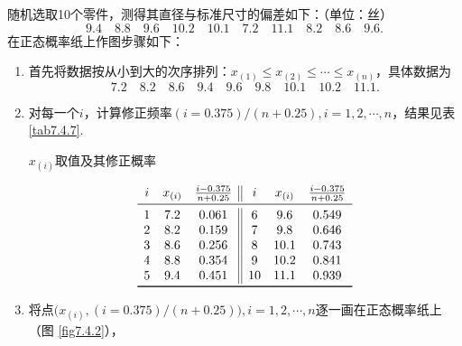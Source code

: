 \begin{example}\label{exam7.4.4}
  随机选取10个零件，测得其直径与标准尺寸的偏差如下：（单位：丝）
  \[
    9.4\quad 8.8 \quad 9.6 \quad 10.2 \quad 10.1 \quad 7.2 \quad 11.1 \quad 8.2 \quad 8.6 \quad 9.6.
  \]
  在正态概率纸上作图步骤如下：
  \begin{enumerate}
    \item 首先将数据按从小到大的次序排列：$x_{(1)}\le x_{(2)}\le\cdots\le x_{(n)}$，具体数据为
        \[
          7.2\quad 8.2 \quad 8.6 \quad 9.4 \quad 9.6 \quad 9.8 \quad 10.1 \quad 10.2 \quad 11.1.
        \]
    \item 对每一个$i$，计算修正频率$(i=0.375)/(n+0.25),i=1,2,\cdots,n$，结果见表 \ref{tab7.4.7}.
    \begin{table}[!ht]
    \centering
    \caption{$x_{(i)}$取值及其修正概率}\label{tab7.4.7}
    \[
      \begin{array}{ccc||ccc}
        i & x_{(i)} & \frac{i-0.375}{n+0.25} & i & x_{(i)} & \frac{i-0.375}{n+0.25} \\
        \midrule
        1 & 7.2 & 0.061 & 6 & 9.6 & 0.549 \\
        2 & 8.2 & 0.159 & 7 & 9.8 & 0.646 \\
        3 & 8.6 & 0.256 & 8 & 10.1 & 0.743 \\
        4 & 8.8 & 0.354 & 9 & 10.2 & 0.841 \\
        5 & 9.4 & 0.451 & 10 & 11.1 & 0.939 \\
        \bottomrule
      \end{array}
    \]
  \end{table}
  \item 将点$\big(x_{(i)},(i=0.375)/(n+0.25)\big),i=1,2,\cdots,n$逐一画在正态概率纸上（图 \ref{fig7.4.2}），
      \begin{figure}[!ht]
        \centering
\end{figure}
\end{enumerate}
\end{example}
